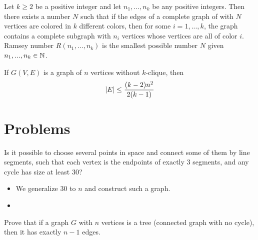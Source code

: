 \documentclass[11pt]{scrartcl}
\begin{document}
\begin{theorem}
Let $k \ge 2$ be a positive integer and let $n_1, ..., n_k$ be any positive integers. Then there exists a number $N$ such that if the edges of a complete graph of with $N$ vertices are colored in $k$ different colors, then for some $i = 1,...,k$, the graph contains a complete subgraph with $n_i$ vertices whose vertices are all of color $i$. Ramsey number $R(n_1,...,n_k)$ is the smallest possible number $N$ given $n_1,...,n_k \in \mathbb N$.
\end{theorem}


\begin{theorem}
If $G(V,E)$ is a graph of $n$ vertices without $k$-clique, then
\[\left\lvert E \right\rvert \le \frac{(k-2)n^2}{2(k-1)}\]
\end{theorem}


\section{Problems}

\begin{Problem}[St. Petersburg]
Is it possible to choose several points in space and connect some of them by line segments, such that each vertex is the endpoints of exactly 3 segments, and any cycle has size at least 30?
\end{Problem}
\begin{itemize}
    \item We generalize $30$ to $n$ and construct such a graph.
    \item 
\end{itemize}


\begin{lemma}
Prove that if a graph $G$ with $n$ vertices is a tree (connected graph with no cycle), then it has exactly $n-1$ edges.
\end{lemma}
\end{document}
